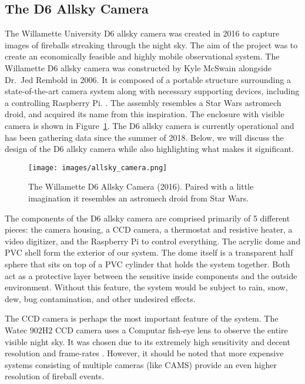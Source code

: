 

\subsection{The D6 Allsky Camera}

The Willamette University D6 allsky camera was created in 2016 to capture images of fireballs streaking through the night sky.
The aim of the project was to create an economically feasible and highly mobile observational system.
The Willamette D6 allsky camera was constructed by Kyle McSwain alongside Dr.~Jed Rembold in 2006.
It is composed of a portable structure surrounding a state-of-the-art camera system along with necessary supporting devices, including a controlling Raspberry Pi. \cite{mcswain_using_2016}.
The assembly resembles a Star Wars astromech droid, and acquired its name from this inspiration.
The enclosure with visible camera is shown in Figure~\ref{droid}.
The D6 allsky camera is currently operational and has been gathering data since the summer of 2018.  
Below, we will discuss the design of the D6 allsky camera while also highlighting what makes it significant.

\begin{figure}[ht!]
  \centering
  \texttt{[image: images/allsky\_camera.png]}
  \caption{The Willamette D6 Allsky Camera (2016). Paired with a little imagination it resembles an astromech droid from Star Wars.}
  \label{droid}
\end{figure}


The components of the D6 allsky camera are comprised primarily of 5 different pieces: the camera housing, a CCD camera, a thermostat and resistive heater, a video digitizer, and the Raspberry Pi to control everything.
The acrylic dome and PVC shell form the exterior of our system. 
The dome itself is a transparent half sphere that sits on top of a PVC cylinder that holds the system together.
Both act as a protective layer between the sensitive inside components and the outside environment.  
Without this feature, the system would be subject to rain, snow, dew, bug contamination, and other undesired effects.

The CCD camera is perhaps the most important feature of the system.
The Watec $902$H$2$ CCD camera uses a Computar fish-eye lens to observe the entire visible night sky.
It was chosen due to its extremely high sensitivity and decent resolution and frame-rates \cite{noauthor_wat-902h2_nodate}.
However, it should be noted that more expensive systems consisting of multiple cameras (like CAMS) provide an even higher resolution of fireball events.

